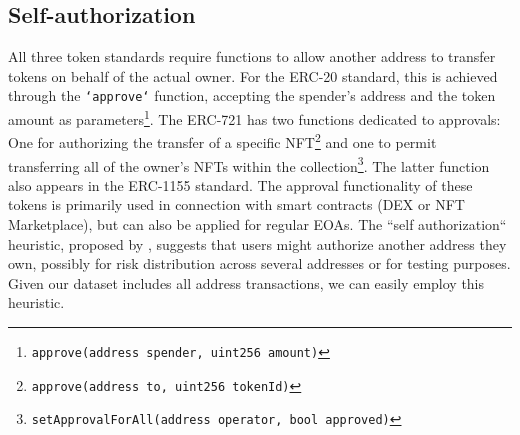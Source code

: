 \documentclass[12pt,a4paper,titlepage,oneside,english]{article}
\begin{document}
\subsection{Self-authorization} 
	All three token standards require functions to allow another address to transfer tokens on behalf of the actual owner. For the ERC-20 standard, this is achieved through the \texttt{`approve`} function, accepting the spender's address and the token amount as parameters\footnote{\texttt{approve(address spender, uint256 amount)}}. The ERC-721 has two functions dedicated to approvals: One for authorizing the transfer of a specific NFT\footnote{\texttt{approve(address to, uint256 tokenId)}} and one to permit transferring all of the owner's NFTs within the collection\footnote{\texttt{setApprovalForAll(address operator, bool approved)}}. The latter function also appears in the ERC-1155 standard. The approval functionality of these tokens is primarily used in connection with smart contracts (DEX or NFT Marketplace), but can also be applied for regular EOAs. \newline
The ``self authorization`` heuristic, proposed by \cite{FV:17}, suggests that users might authorize another address they own, possibly for risk distribution across several addresses or for testing purposes. \newline
Given our dataset includes all address transactions, we can easily employ this heuristic. %


\iffalse
	For the ERC-20 standard: \texttt{approve(address spender, uint256 amount)}
	For the ERC-721 standard: \texttt{approve(address to, uint256 tokenId)} and \texttt{setApprovalForAll(address operator, bool approved)}\\
	For the ERC-1155 standard: \texttt{setApprovalForAll(address operator, bool approved)}
	
	- approve(address,uint256)
	- setApprovalForAll(address,bool) for both ERC-721 and ERC-1155
	
The first step is to get all approval transactions. We achieve this using the 'input'/calldata field. The first X bytes are always the function selector. We filter for the known function selectors for all standards. Next, we get the approved address/spender, also from the calldata, it is always at the same spot. We filter for spenders within the address set and for spenders who are different from the 'from' address. How many transactions are remaining? Finally, we extract all unique pairs of owners and spenders, disregarding the type of token or the amount.
\fi
\end{document}

